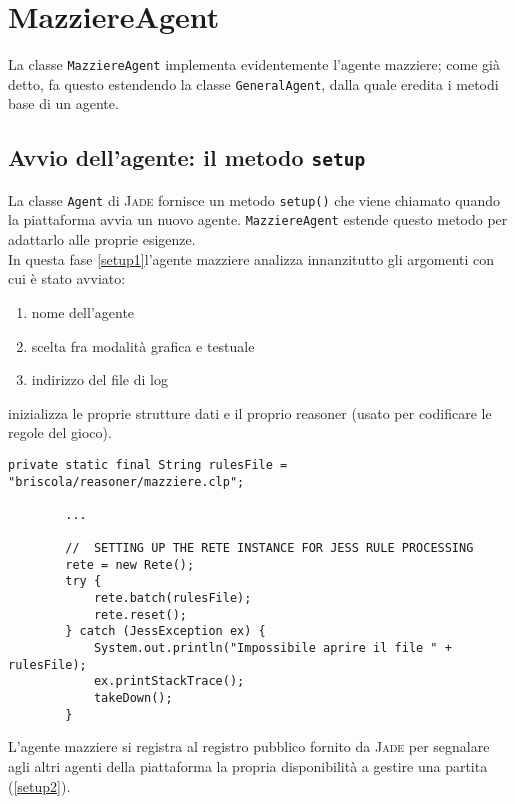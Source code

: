 \section{MazziereAgent}

La classe \texttt{MazziereAgent} implementa evidentemente l'agente mazziere; come già detto, fa questo estendendo la classe \texttt{GeneralAgent}, dalla quale eredita i metodi base di un agente.\\

\subsection{Avvio dell'agente: il metodo \texttt{setup}}
La classe \texttt{Agent} di \textsc{Jade} fornisce un metodo \texttt{setup()} che viene chiamato quando la piattaforma avvia un nuovo agente.
\texttt{MazziereAgent} estende questo metodo per adattarlo alle proprie esigenze.\\
In questa fase \ref{setup1}l'agente mazziere analizza innanzitutto gli argomenti con cui è stato avviato:
\begin{enumerate}
   \item nome dell'agente
   \item scelta fra modalità grafica e testuale
   \item indirizzo del file di log
\end{enumerate}
inizializza le proprie strutture dati e il proprio reasoner (usato per codificare le regole del gioco).
\begin{lstlisting}[caption={stralcio del metodo setup() di MazziereAgent: inizializzazione strutture e reasoner},label=setup1]
        private static final String rulesFile = "briscola/reasoner/mazziere.clp";
        
        ...
        
        //  SETTING UP THE RETE INSTANCE FOR JESS RULE PROCESSING
        rete = new Rete();
        try {
            rete.batch(rulesFile);
            rete.reset();
        } catch (JessException ex) {
            System.out.println("Impossibile aprire il file " + rulesFile);
            ex.printStackTrace();
            takeDown();
        }
\end{lstlisting}


L'agente mazziere si registra al registro pubblico fornito da \textsc{Jade} per segnalare agli altri agenti della piattaforma la propria disponibilità a gestire una partita (\ref{setup2}). 

